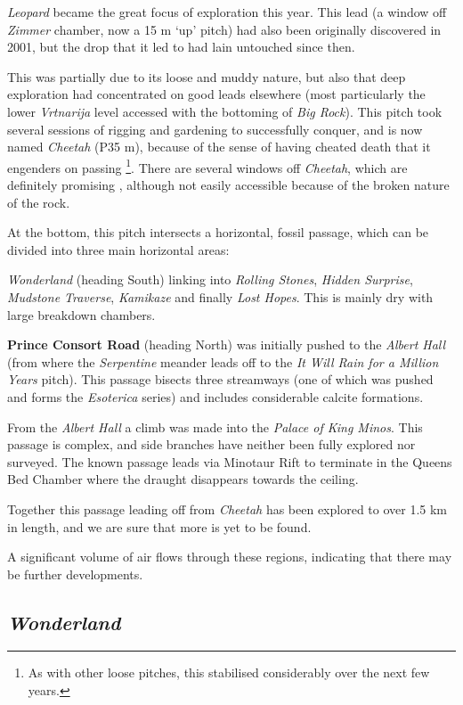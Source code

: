 \emph{Leopard} became the great focus of exploration this year. This
lead (a window off \emph{Zimmer} chamber, now a 15 m `up' pitch) had
also been originally discovered in 2001, but the drop that it led to had
lain untouched since then.

This was partially due to its loose and muddy nature, but also that deep
exploration had concentrated on good leads elsewhere (most particularly
the lower \emph{Vrtnarija} level accessed with the bottoming of
\emph{Big Rock}). This pitch took several sessions of rigging and
gardening to successfully conquer, and is now named \emph{Cheetah} (P35
m), because of the sense of having cheated death that it engenders on
passing
\footnote{As with other loose pitches, this stabilised considerably over
the next few years.}. There are several windows off \emph{Cheetah},
which are definitely promising
,
although not easily accessible because of the broken nature of the rock.

At the bottom, this pitch intersects a horizontal, fossil passage, which
can be divided into three main horizontal areas:

\emph{Wonderland} (heading South) linking into \emph{Rolling Stones},
\emph{Hidden Surprise}, \emph{Mudstone Traverse}, \emph{Kamikaze} and
finally \emph{Lost Hopes}. This is mainly dry with large breakdown
chambers.

\textbf{Prince Consort Road} (heading North) was initially pushed to the
\emph{Albert Hall} (from where the \emph{Serpentine} meander leads off
to the \emph{It Will Rain for a Million Years} pitch). This passage
bisects three streamways (one of which was pushed and forms the
\emph{Esoterica} series) and includes considerable calcite formations.

From the \emph{Albert Hall} a climb was made into the \emph{Palace of
King Minos}. This passage is complex, and side branches have neither
been fully explored nor surveyed. The known passage leads via Minotaur
Rift to terminate in the Queens Bed Chamber where the draught disappears
towards the ceiling.

Together this passage leading off from \emph{Cheetah} has been explored
to over 1.5 km in length, and we are sure that more is yet to be found.

A significant volume of air flows through these regions, indicating that
there may be further developments.


\subsection{\texorpdfstring{\emph{Wonderland}}{Wonderland}}

